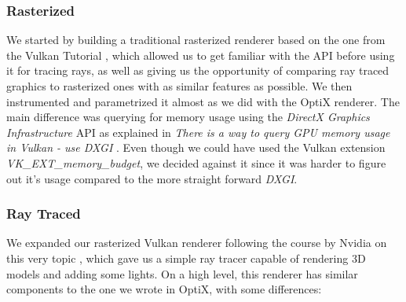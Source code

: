 \subsubsection{Rasterized}
We started by building a traditional rasterized renderer based on the one from the Vulkan Tutorial \cite{VulkanTutorial}, which allowed us to get familiar with the API before using it for tracing rays, as well as giving us the opportunity of comparing ray traced graphics to rasterized ones with as similar features as possible. We then instrumented and parametrized it almost as we did with the OptiX renderer. The main difference was querying for memory usage using the \textit{DirectX Graphics Infrastructure} API \cite{DXGI} as explained in \textit{There is a way to query GPU memory usage in Vulkan - use DXGI} \cite{GpuMemUsageVulkan}. Even though we could have used the Vulkan extension \textit{VK\_EXT\_memory\_budget}, we decided against it since it was harder to figure out it's usage compared to the more straight forward \textit{DXGI}.

\subsubsection{Ray Traced}
We expanded our rasterized Vulkan renderer following the course by Nvidia on this very topic \cite{VulkanRaytracingTutorial}, which gave us a simple ray tracer capable of rendering 3D models and adding some lights. On a high level, this renderer has similar components to the one we wrote in OptiX, with some differences:

